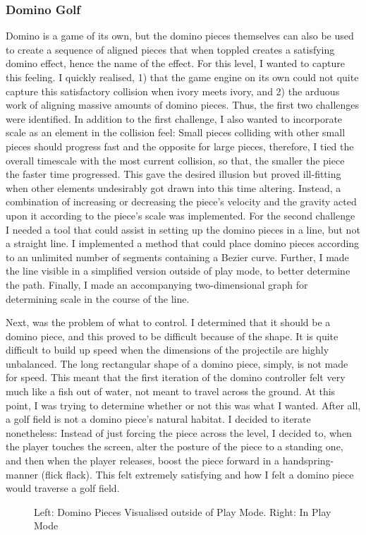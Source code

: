 \subsubsection{Domino Golf}
Domino is a game of its own, but the domino pieces themselves can also be used to create a sequence of aligned pieces that when toppled creates a satisfying domino effect, hence the name of the effect. For this level, I wanted to capture this feeling. I quickly realised, 1) that the game engine on its own could not quite capture this satisfactory collision when ivory meets ivory, and 2) the arduous work of aligning massive amounts of domino pieces. Thus, the first two challenges were identified. In addition to the first challenge, I also wanted to incorporate scale as an element in the collision feel: Small pieces colliding with other small pieces should progress fast and the opposite for large pieces, therefore, I tied the overall timescale with the most current collision, so that, the smaller the piece the faster time progressed. This gave the desired illusion but proved ill-fitting when other elements undesirably got drawn into this time altering. Instead, a combination of increasing or decreasing the piece's velocity and the gravity acted upon it according to the piece's scale was implemented. For the second challenge I needed a tool that could assist in setting up the domino pieces in a line, but not a straight line. I implemented a method that could place domino pieces according to an unlimited number of segments containing a Bezier curve. Further, I made the line visible in a simplified version outside of play mode, to better determine the path. Finally, I made an accompanying two-dimensional graph for determining scale in the course of the line.

Next, was the problem of what to control. I determined that it should be a domino piece, and this proved to be difficult because of the shape. It is quite difficult to build up speed when the dimensions of the projectile are highly unbalanced. The long rectangular shape of a domino piece, simply, is not made for speed. This meant that the first iteration of the domino controller felt very much like a fish out of water, not meant to travel across the ground. At this point, I was trying to determine whether or not this was what I wanted. After all, a golf field is not a domino piece's natural habitat. I decided to iterate nonetheless: Instead of just forcing the piece across the level, I decided to, when the player touches the screen, alter the posture of the piece to a standing one, and then when the player releases, boost the piece forward in a handspring-manner (flick flack). This felt extremely satisfying and how I felt a domino piece would traverse a golf field.
\begin{center}
  \begin{figure}[!htb]
    \noindent{}
    \caption{Left: Domino Pieces Visualised outside of Play Mode. Right: In Play Mode}
    \label{Domino}
  \end{figure}
\end{center}

